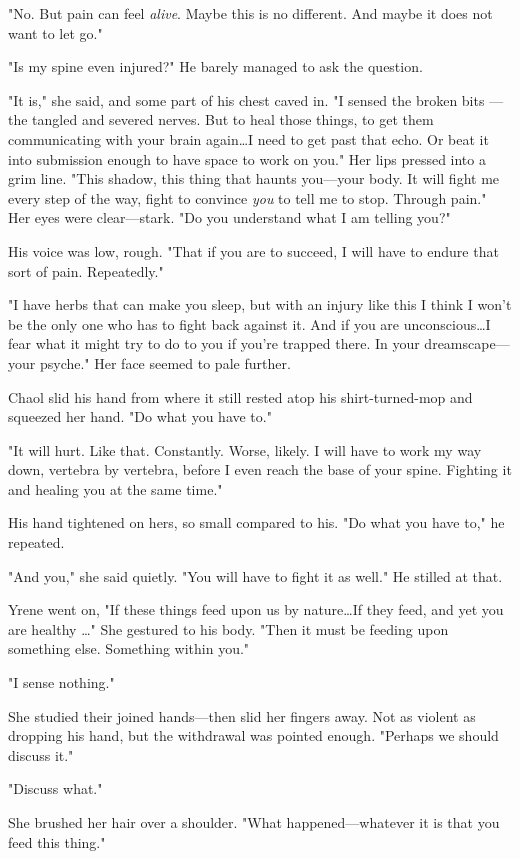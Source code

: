 "No.
But pain can feel \emph{alive}.
Maybe this is no different.
And maybe it does not want to let go."

"Is my spine even injured?"
He barely managed to ask the question.

"It is," she said, and some part of his chest caved in.
"I sensed the broken bits ---the tangled and severed nerves.
But to heal those things, to get them communicating with your brain again\ldots I need to get past that echo.
Or beat it into submission enough to have space to work on you."
Her lips pressed into a grim line.
"This shadow, this thing that haunts you---your body.
It will fight me every step of the way, fight to convince \emph{you} to tell me to stop.
Through pain."
Her eyes were clear---stark.
"Do you understand what I am telling you?"

His voice was low, rough.
"That if you are to succeed, I will have to endure that sort of pain.
Repeatedly."

"I have herbs that can make you sleep, but with an injury like this  I think I won't be the only one who has to fight back against it.
And if you are unconscious\ldots I fear what it might try to do to you if you're trapped there.
In your dreamscape---your psyche."
Her face seemed to pale further.

Chaol slid his hand from where it still rested atop his shirt-turned-mop and squeezed her hand.
"Do what you have to."

"It will hurt.
Like that.
Constantly.
Worse, likely.
I will have to work my way down, vertebra by vertebra, before I even reach the base of your spine.
Fighting it and healing you at the same time."

His hand tightened on hers, so small compared to his.
"Do what you have to," he repeated.

"And you," she said quietly.
"You will have to fight it as well."
He stilled at that.

Yrene went on, "If these things feed upon us by nature\ldots If they feed, and yet you are healthy \ldots" She gestured to his body.
"Then it must be feeding upon something else.
Something within you."

"I sense nothing."

She studied their joined hands---then slid her fingers away.
Not as violent as dropping his hand, but the withdrawal was pointed enough.
"Perhaps we should discuss it."

"Discuss what."

She brushed her hair over a shoulder.
"What happened---whatever it is that you feed this thing."

